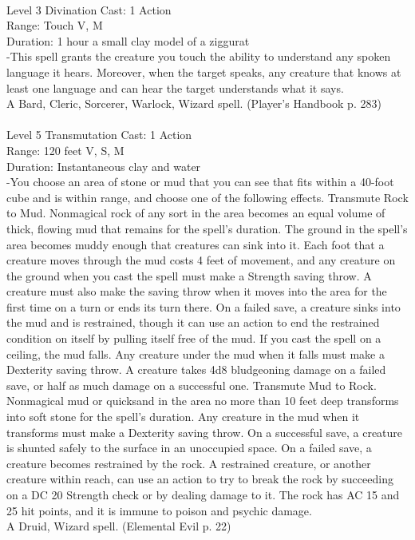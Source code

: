 \documentclass[10pt,twocolumn]{report}
\begin{document}
 \\
Level 3 \quad Divination \quad Cast: 1 Action\\
Range: Touch \quad V, M\\
Duration: 1 hour \quad a small clay model of a ziggurat\\
-This spell grants the creature you touch the ability to understand any spoken language it hears. Moreover, when the target speaks, any creature that knows at least one language and can hear the target understands what it says.\\
A Bard, Cleric, Sorcerer, Warlock, Wizard spell. (Player's Handbook p. 283) \\


 \\
Level 5 \quad Transmutation \quad Cast: 1 Action\\
Range: 120 feet \quad V, S, M\\
Duration: Instantaneous \quad clay and water\\
-You choose an area of stone or mud that you can see that fits within a 40-foot cube and is within range, and choose one of the following effects.
Transmute Rock to Mud. Nonmagical rock of any sort in the area becomes an equal volume of thick, flowing mud that remains for the spell’s duration.
The ground in the spell’s area becomes muddy enough that creatures can sink into it. Each foot that a creature moves through the mud costs 4 feet of movement, and any creature on the ground when you cast the spell must make a Strength saving throw. A creature must also make the saving throw when it moves into the area for the first time on a turn or ends its turn there. On a failed save, a creature sinks into the mud and is restrained, though it can use an action to end the restrained condition on itself by pulling itself free of the mud.
If you cast the spell on a ceiling, the mud falls. Any creature under the mud when it falls must make a Dexterity saving throw. A creature takes 4d8 bludgeoning damage on a failed save, or half as much damage on a successful one.
Transmute Mud to Rock. Nonmagical mud or quicksand in the area no more than 10 feet deep transforms into soft stone for the spell’s duration. Any creature in the mud when it transforms must make a Dexterity saving throw. On a successful save, a creature is shunted safely to the surface in an unoccupied space. On a failed save, a creature becomes restrained by the rock. A restrained creature, or another creature within reach, can use an action to try to break the rock by succeeding on a DC 20 Strength check or by dealing damage to it. The rock has AC 15 and 25 hit points, and it is immune to poison and psychic damage.\\
A Druid, Wizard spell. (Elemental Evil p. 22) \\
\end{document}
